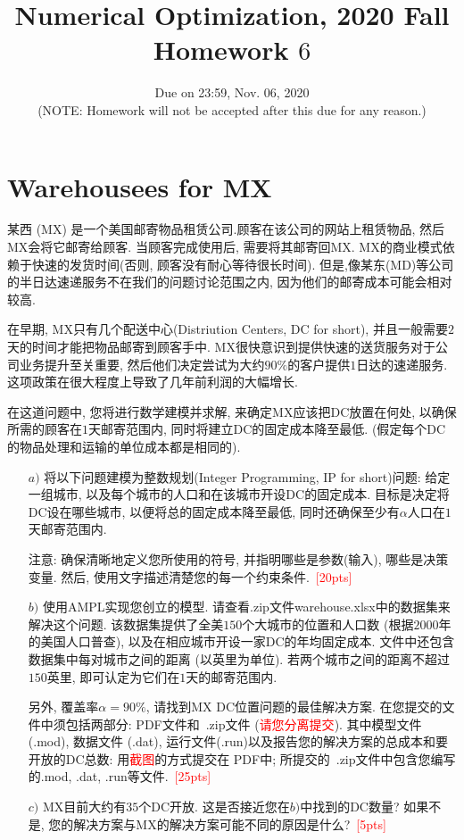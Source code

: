 \documentclass[10pt]{article}
\begin{document}
	
\title{	Numerical Optimization, 2020 Fall\\Homework $6$}
\date{Due on 23:59, Nov. 06, 2020 \\(NOTE: Homework will not be accepted after this due for any reason.)\\}
\maketitle
\section{\textbf{Warehousees for MX}}
某西 (MX) 是一个美国邮寄物品租赁公司.顾客在该公司的网站上租赁物品, 然后MX会将它邮寄给顾客. 当顾客完成使用后, 需要将其邮寄回MX. MX的商业模式依赖于快速的发货时间(否则, 顾客没有耐心等待很长时间). 但是,像某东(MD)等公司的半日达速递服务不在我们的问题讨论范围之内, 因为他们的邮寄成本可能会相对较高.

在早期, MX只有几个配送中心(Distriution Centers, DC for short), 并且一般需要$2$天的时间才能把物品邮寄到顾客手中. MX很快意识到提供快速的送货服务对于公司业务提升至关重要, 然后他们决定尝试为大约$90\%$的客户提供$1$日达的速递服务. 这项政策在很大程度上导致了几年前利润的大幅增长.

在这道问题中, 您将进行数学建模并求解, 来确定MX应该把DC放置在何处, 以确保所需的顾客在$1$天邮寄范围内, 同时将建立DC的固定成本降至最低. (假定每个DC的物品处理和运输的单位成本都是相同的).
\begin{itemize}
	\item[$a)$] 将以下问题建模为整数规划(Integer Programming, IP for short)问题: 给定一组城市, 以及每个城市的人口和在该城市开设DC的固定成本. 目标是决定将DC设在哪些城市, 以便将总的固定成本降至最低, 同时还确保至少有$\alpha$人口在$1$天邮寄范围内. 
	
	注意: 确保清晰地定义您所使用的符号, 并指明哪些是参数(输入), 哪些是决策变量. 然后, 使用文字描述清楚您的每一个约束条件.~\textcolor{red}{[20pts]}

	\item[$b)$] 使用AMPL实现您创立的模型. 请查看.zip文件warehouse.xlsx中的数据集来解决这个问题. 该数据集提供了全美$150$个大城市的位置和人口数 (根据$2000$年的美国人口普查), 以及在相应城市开设一家DC的年均固定成本. 文件中还包含数据集中每对城市之间的距离 (以英里为单位). 若两个城市之间的距离不超过$150$英里, 即可认定为它们在$1$天的邮寄范围内.
	
	另外, 覆盖率$\alpha = 90\%$, 请找到MX DC位置问题的最佳解决方案. 在您提交的文件中须包括两部分: PDF文件和~.zip文件 (\textcolor{red}{请您分离提交}). 其中模型文件(.mod), 数据文件 (.dat), 运行文件(.run)以及报告您的解决方案的总成本和要开放的DC总数: 用\textcolor{red}{截图}的方式提交在 PDF中; 所提交的~.zip文件中包含您编写的.mod, .dat, .run等文件.~\textcolor{red}{[25pts]}
	
	\item[$c)$] MX目前大约有$35$个DC开放. 这是否接近您在$b)$中找到的DC数量? 如果不是, 您的解决方案与MX的解决方案可能不同的原因是什么?~\textcolor{red}{[5pts]}
\end{itemize}
\newpage
\end{document}
